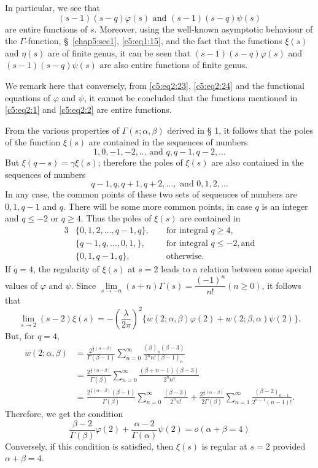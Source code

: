 In particular, we see that
$$
(s-1)(s-q) \varphi(s) \text{ and }(s-1)(s-q)\psi (s)
$$
are entire functions of $s$. Moreover, using the well-known asymptotic
behaviour of the $\Gamma$-function, \S~\ref{chap5:sec1}, \eqref{c5:eq1:15}, 
and the fact that the
functions $\xi(s)$ and $\eta(s)$ are of finite genus, it can be seen
that $(s-1)(s-q)\varphi(s)$ and $(s-1)(s-q)\psi(s)$ are also entire
functions of finite genus.

We remark here that conversely, from \eqref{c5:eq2:23}, \eqref{c5:eq2:24} and the functional
equations of $\varphi$ and $\psi$, it cannot be concluded that the
functions mentioned in \eqref{c5:eq2:1} and \eqref{c5:eq2:2} are entire functions.

From the various properties of $\Gamma(s;\alpha,\beta)$ derived in \S
1, it follows that the poles of the function $\xi(s)$ are contained in
the sequences of numbers 
$$
1, 0, -1, -2, \ldots \text{ and } q,q-1, q-2, \ldots
$$
But $\xi(q-s)=\gamma\xi(s)$; therefore the poles of $\xi(s)$ are also
contained in the sequences of numbers 
$$
q-1, q, q+1, q+2, \ldots, \text{ and } 0,1,2,\ldots
$$\pageoriginale 
In any case, the common points of these two sets of sequences of
numbers are $0,1,q-1$ and $q$. There will be some more common points,
in case $q$ is an integer and $q\leq -2$ or $q\geq 4$. Thus the poles
of $\xi(s)$ are contained in 
\begin{alignat*}{3}
& \{0,1,2,\ldots, q-1,q\},& & \text{ for integral } q\geq 4,\\
&\{q-1, q,\ldots, 0,1,\}, && \text{ for integral } q \leq -2, \text{
  and}\\
&\{0, 1, q-1, q\}, & &\text{ otherwise}.
\end{alignat*}
If $q=4$, the regularity of $\xi(s)$ at $s=2$ leads to a relation
between some special values of $\varphi$ and $\psi$. Since
$\lim\limits_{s\to -n}(s+n)\Gamma(s)=\dfrac{(-1)^n}{n!}(n\geq 0)$, it
follows that 
$$
\lim\limits_{s\to 2} (s-2)\xi(s) = - \left(\frac{\lambda}{2\pi}\right)^2 
\{w(2;\alpha,\beta) \varphi(2) + w(2;\beta,\alpha)\psi(2)\}. 
$$
But, for $q=4$,
\begin{align*}
w(2;\alpha,\beta) & =
\frac{2^{\frac{1}{2}(\alpha-\beta)}}{\Gamma(\beta-1)}
\sum^{\infty}_{n=0} \frac{(\beta)_n(\beta-3)}{2^nn!(\beta-1)_n}\\
& = \frac{2^{\frac{1}{2}(\alpha-\beta)}}{\Gamma(\beta)}
\sum^{\infty}_{n=0} \frac{(\beta+n-1)(\beta-3)}{2^n n!}\\
& = \frac{2^{\frac{1}{2}(\alpha-\beta)} (\beta-1)}{\Gamma(\beta)}
\sum^{\infty}_{n=0} \frac{(\beta-3)}{2^n n!} +
\frac{2^{\frac{1}{2}(\alpha-\beta)}}{2\Gamma(\beta)}
\sum^{\infty}_{n=1} \frac{(\beta-2)_{n-1}}{2^{n-1}(n-1)!}. 
\end{align*}
Therefore, we get the condition
$$
\frac{\beta-2}{\Gamma(\beta)} \varphi(2) +
\frac{\alpha-2}{\Gamma(\alpha)} \psi(2) = o (\alpha+\beta=4) 
$$
Conversely, if this condition is satisfied, then $\xi(s)$ is regular
at $s=2$ provided $\alpha+\beta=4$.

